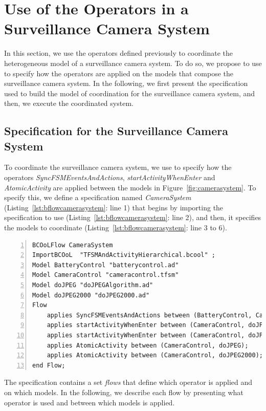 \section{Use of the Operators in a Surveillance Camera System}
In this section, we use the operators defined previously to coordinate the heterogeneous model of a surveillance camera system. To do so, we propose to use \bflow to specify how the operators are applied on the models that compose the surveillance camera system. In the following, we first present the \bflow specification used to build the model of coordination for the surveillance camera system, and then, we execute the coordinated system. 

\subsection{\bflow Specification for the Surveillance Camera System}
To coordinate the surveillance camera system, we use \bflow to specify how the operators \emph{SyncFSMEventsAndActions}, \emph{startActivityWhenEnter} and \emph{AtomicActivity} are applied between the models in Figure~\ref{fig:camerasystem}. To specify this, we define a \bflow specification named \emph{CameraSystem} (Listing~\ref{lst:bflowcamerasystem}: line 1) that begins by importing the \bcool specification to use (Listing~\ref{lst:bflowcamerasystem}: line 2), and then, it specifies the models to coordinate (Listing~\ref{lst:bflowcamerasystem}: line 3 to 6).

\begin{lstlisting}[language=bflow,
caption={\bflow specification for the Surveillance Camera System},
label={lst:bflowcamerasystem}, 
basicstyle=\scriptsize\ttfamily, backgroundcolor=\color{LGrey}, numbers=left, xleftmargin=2pt]
BCOoLFlow CameraSystem
ImportBCOoL  "TFSMAndActivityHierarchical.bcool" ;
Model BatteryControl "batterycontrol.ad"
Model CameraControl "cameracontrol.tfsm"
Model doJPEG "doJPEGAlgorithm.ad"
Model doJPEG2000 "doJPEG2000.ad"
Flow 
	applies SyncFSMEventsAndActions between (BatteryControl, CameraControl);
	applies startActivityWhenEnter between (CameraControl, doJPEG);
	applies startActivityWhenEnter between (CameraControl, doJPEG2000);
	applies AtomicActivity between (CameraControl, doJPEG);		
	applies AtomicActivity between (CameraControl, doJPEG2000);		
end Flow;
\end{lstlisting}

The specification contains a set \emph{flows} that define which operator is applied and on which models. In the following, we describe each flow by presenting what operator is used and between which models is applied.  

